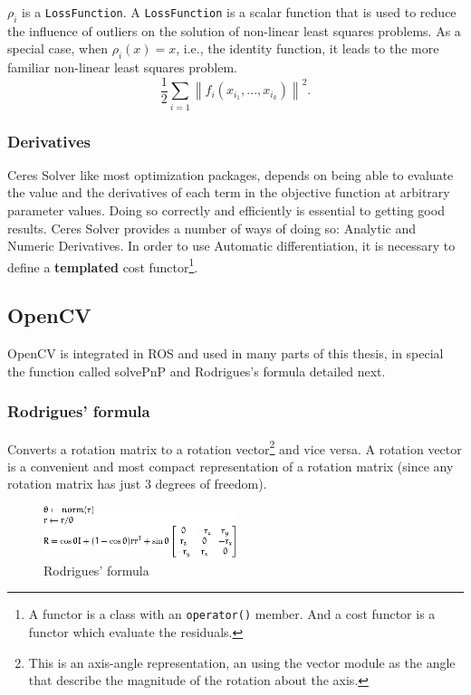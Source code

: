 $\rho_i$ is a \texttt{LossFunction}. A \texttt{LossFunction} is a scalar function that is used to reduce the influence of outliers on the solution of non-linear least squares problems. As a special case, when $\rho_i(x) = x$, i.e., the identity function, it leads to the more familiar non-linear least squares problem.
\[
 \frac{1}{2}\sum_{i=1} \left\|f_i\left(x_{i_1}, ... ,x_{i_k}\right)\right\|^2.
\]

\subsubsection*{Derivatives}
Ceres Solver like most optimization packages, depends on being able to evaluate the value and the derivatives of each term in the objective function at arbitrary parameter values. Doing so correctly and efficiently is essential to getting good results. Ceres Solver provides a number of ways of doing so: Analytic and Numeric Derivatives. In order to use Automatic differentiation, it is necessary to define a \textbf{templated} cost functor\footnote{A functor is a class with an \texttt{operator()} member. And a cost functor is a functor which evaluate the residuals.}.



\subsection{OpenCV}

OpenCV is integrated in ROS and used in many parts of this thesis, in special the function called solvePnP and Rodrigues's formula detailed next.


\subsubsection{Rodrigues' formula}

Converts a rotation matrix to a rotation vector\footnote{This is an axis-angle representation, an using the vector module as the angle that describe the magnitude of the rotation about the axis.} and vice versa. A rotation vector is a convenient and most compact representation of a rotation matrix (since any rotation matrix has just 3 degrees of freedom).

\begin{figure}[!htbp]
 \centering
 \includegraphics[width=0.5\textwidth]{images/rodrigues01.png}
 \caption{Rodrigues' formula}
 \label{fig:rodrigues}
\end{figure}

